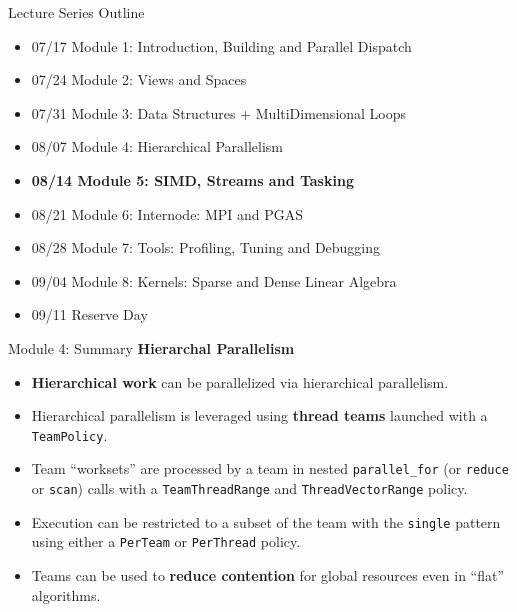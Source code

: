 \begin{frame}[fragile]{Lecture Series Outline}

\begin{itemize}
        \item 07/17 Module 1: Introduction, Building and Parallel Dispatch
        \item 07/24 Module 2: Views and Spaces
        \item 07/31 Module 3: Data Structures + MultiDimensional Loops
        \item 08/07 Module 4: Hierarchical Parallelism
        \item \textbf{08/14 Module 5: SIMD, Streams and Tasking}
        \item 08/21 Module 6: Internode: MPI and PGAS
        \item 08/28 Module 7: Tools: Profiling, Tuning and Debugging
        \item 09/04 Module 8: Kernels: Sparse and Dense Linear Algebra
        \item 09/11 Reserve Day
\end{itemize}

\end{frame}



\begin{frame}[fragile]{Module 4: Summary}
	\textbf{Hierarchal Parallelism}
  \begin{itemize}
    \item{\textbf{Hierarchical work} can be parallelized via hierarchical parallelism.}
    \item{Hierarchical parallelism is leveraged using \textbf{thread teams} launched with a \texttt{TeamPolicy}.}
    \item{Team ``worksets'' are processed by a team in nested \texttt{parallel\_for} (or \texttt{reduce} or \texttt{scan}) calls with a \texttt{TeamThreadRange} and \texttt{ThreadVectorRange} policy.}
    \item{Execution can be restricted to a subset of the team with the \texttt{single} pattern using either a \texttt{PerTeam} or \texttt{PerThread} policy.}
    \item{Teams can be used to \textbf{reduce contention} for global resources even in ``flat'' algorithms.}
  \end{itemize}


  
\end{frame}

